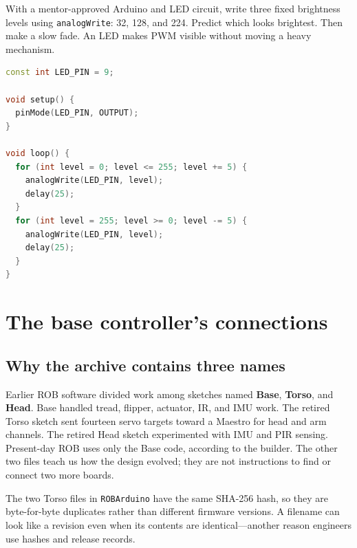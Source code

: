 \documentclass[11pt,openany]{book}
\begin{document}
\begin{buildbox}[title={LED PWM MISSION}]
With a mentor-approved Arduino and LED circuit, write three fixed brightness levels using \texttt{analogWrite}: 32, 128, and 224. Predict which looks brightest. Then make a slow fade. An LED makes PWM visible without moving a heavy mechanism.
\end{buildbox}

\begin{lstlisting}[language=C++,caption={A safe LED fade pattern for a classroom PWM pin.}]
const int LED_PIN = 9;

void setup() {
  pinMode(LED_PIN, OUTPUT);
}

void loop() {
  for (int level = 0; level <= 255; level += 5) {
    analogWrite(LED_PIN, level);
    delay(25);
  }
  for (int level = 255; level >= 0; level -= 5) {
    analogWrite(LED_PIN, level);
    delay(25);
  }
}
\end{lstlisting}


\chapter{The base controller's connections}

\section*{Why the archive contains three names}

Earlier ROB software divided work among sketches named \textbf{Base}, \textbf{Torso}, and \textbf{Head}. Base handled tread, flipper, actuator, IR, and IMU work. The retired Torso sketch sent fourteen servo targets toward a Maestro for head and arm channels. The retired Head sketch experimented with IMU and PIR sensing. Present-day ROB uses only the Base code, according to the builder. The other two files teach us how the design evolved; they are not instructions to find or connect two more boards.

The two Torso files in \texttt{ROBArduino} have the same SHA-256 hash, so they are byte-for-byte duplicates rather than different firmware versions. A filename can look like a revision even when its contents are identical---another reason engineers use hashes and release records.
\end{document}
